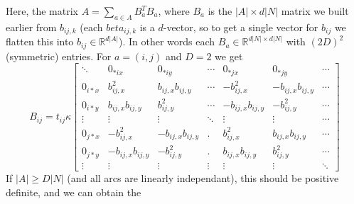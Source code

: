 \documentclass{article}
\begin{document}
Here, the matrix $A=\sum_{a\in A} B_a^TB_a$, where $B_a$ is the $|A| \times
d|N|$ matrix we built earlier from $b_{ij,k}$ (each $beta_{ij,k}$ is a
$d$-vector, so to get a single vector for $b_{ij}$ we flatten this into
$b_{ij}\in\mathbb{R}^{d|A|}$). In other words each
$B_a\in\mathbb{R}^{d|N|\times d|N|}$ with $(2D)^2$ (symmetric) entries. For $a=(i,j)$ and $D=2$ we get 
\[
    B_{ij} = t_{ij}\kappa\left[
        \begin{array}{ccccccc}
            \ddots  & 0_{*ix}           & 0_{*iy}           & \cdots & 0_{*jx}           & 0_{*jy}           & \cdots \\
            0_{i*x} & b_{ij,x}^2        & b_{ij,x}b_{ij,y}  & \cdots & -b_{ij,x}^2       & -b_{ij,x}b_{ij,y} & \cdots \\
            0_{i*y} & b_{ij,x}b_{ij,y}  & b_{ij,y}^2        & \cdots & -b_{ij,x}b_{ij,y} & - b_{ij,y}^2      & \cdots \\
            \vdots  & \vdots            & \vdots            & \ddots & \vdots            & \vdots            & \cdots \\
            0_{j*x} & -b_{ij,x}^2       & -b_{ij,x}b_{ij,y} & .      & b_{ij,x}^2        & b_{ij,x}b_{ij,y}  & \cdots \\
            0_{j*y} & -b_{ij,x}b_{ij,y} & -b_{ij,y}^2       & .      & b_{ij,x}b_{ij,y}  & b_{ij,y}^2        & \cdots \\
            \vdots  & \vdots            & \vdots            & \vdots & \vdots            & \vdots            & \ddots 
        \end{array}
    \right]
\]
If $|A| \geq D|N|$ (and all arcs are linearly independant), this should be positive definite, and we can obtain the 
\end{document}
